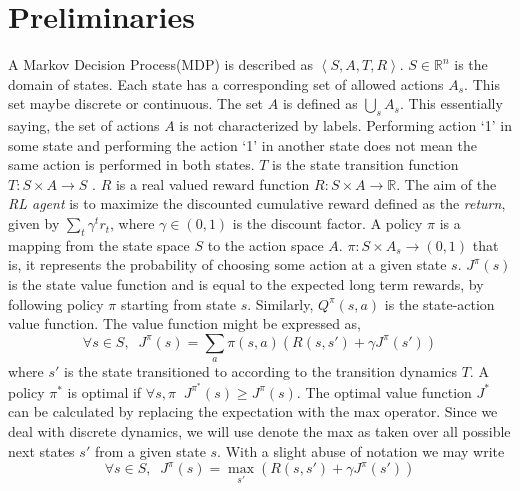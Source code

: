 \documentclass[wcp]{jmlr}
\begin{document}
\section{Preliminaries}
A Markov Decision Process(MDP) is described as $\left\langle S,A,T,R\right\rangle$. $S\in \mathbb{R}^n$ is the domain of states. Each state has a corresponding set of allowed actions $A_s$. This set maybe discrete or continuous. The set $A$ is defined as $\bigcup_{s} A_s $. This essentially saying, the set of actions $A$ is not characterized by labels. Performing action `1' in some state and performing the action `1' in another state does not mean the same action is performed in both states. $T$ is the state transition function $T:S \times A \rightarrow S$ .  $R$ is a real valued reward function $R:S \times A \rightarrow \mathbb{R}$. The aim of the \textit{RL agent} is to maximize the discounted cumulative reward defined as the \emph{return}, given by $ \sum_{t} \gamma^tr_t $, where $\gamma \in (0,1)$ is the discount factor.
A policy $\pi$ is a mapping from the state space $S$ to the action space $A$. $\pi :S \times A_s \rightarrow (0,1)$ that is, it represents the probability of choosing some action at a given state $s$. $J^\pi(s)$ is the state value function and is equal to the expected long term rewards, by following policy $\pi$ starting from state $s$. Similarly, $Q^\pi(s,a)$ is the state-action value function. The value function might be expressed as,
\begin{equation}
\label{eq:Vbell}
\forall s \in S,\;\; J^\pi(s) = \sum_{a}\pi(s,a)( R(s,s') + \gamma J^\pi(s'))
\end{equation}
where $s'$ is the state transitioned to according to the transition dynamics $T$. A policy $\pi^*$ is optimal if $ \forall s,\pi\;\; J^{\pi^*}(s)\geq J^\pi(s) $. The optimal value function $J^*$ can be calculated by replacing the expectation with the max operator. Since we deal with discrete dynamics, we will use denote the max as taken over all possible next states $s'$ from a given state $s$. With a slight abuse of notation we may write
\begin{equation}
\label{eq:Vopt}
\forall s \in S,\;\; J^\pi(s) = \max_{s'}( R(s,s') + \gamma J^\pi(s'))
\end{equation} 
\end{document}
